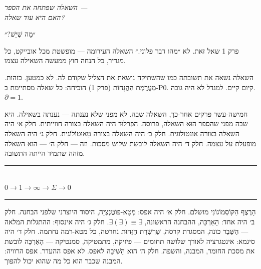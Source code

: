 \documentclass[10pt, openany, oneside]{book}
\renewcommand{\normalsize}{\fontsize{10}{13}\selectfont}
\begin{document}
\vspace{1.5em}

\begin{center}
    \textit{%
    השאלה שפתחה את הספר —\\
    האם היא עוד שאלה?}
\end{center}

\vspace{2em}


\noindent ״מַה שֶׁיֵּשׁ?״

פרק 1 שאל זאת. לא ״מהו דבר פלוני.״ השאלה העירומה — מופשטת מכל אובייקט, כל מגדיר, כל הנחה חוץ ממעשה השאילה עצמו.

השאלה נשאה את תשובתה כמו שהשתיקה נושאת את הצליל שקודם לה. לא כמטען. כזהות. מַעֲרֶמֶת הַהֲנָחוֹת (פרק 1) הוכיחה: כל שאלה מסתיימת ב-P0. קיום קיים. למגדל לא היה גובה. $\partial = 1$.

חמישה-עשר פרקים אחר-כך, השאלה שבה. לא מפני שלא נענתה — נענתה בשאילה. היא שבה מפני שהספר הוּא השאלה, פרוסה. הפְּרֵלוּד היה השאלה בצורה חווייתית. חלק א׳ היה השאלה בצורה אונטולוגית. חלק ב׳ היה השאלה בצורה טָאוּטוֹלוֹגִית. חלק ג׳ היה השאלה מופעלת על עצמה. חלק ד׳ היה השאלה לובשת שלוש מסכות. וזה — חלק ה׳ — הוא השאלה מזהה שתמיד הייתה התשובה.

\vspace{1.5em}


\begin{center}
    \rule{0.3\textwidth}{0.4pt}\\[0.5em]
    {\normalsize\bfseries\textsc{$0 \to 1 \to \infty \to \Sigma \to 0$}}\\[0.3em]
    \rule{0.3\textwidth}{0.4pt}
\end{center}

\vspace{1em}

\noindent הָרֶצֶף הַקּוֹסְמוֹגוֹנִי מושלם. חלק א׳ היה אפס: מֶטָא-פּוֹטֶנְצְיָה, היסוד היוצרני שלפני הבחנה. חלק ב׳ היה אחד: הָאַרְכֵּה, ההבחנה הראשונה, $\exists(\exists) \equiv \exists$. חלק ג׳ היה אינסוף: ההתגלות המלאה — הַשֶּׁבֶר כונה, המסגרת קרסה, שַׁרְשֶׁרֶת הַזֵּהוּת נחרטה, כל מטא-רמה נחתמה. חלק ד׳ היה סיגמא: אינטגרציה לאורך שלושה תחומים — פיזיקה, מתמטיקה, סמנטיקה — הָאַרְכֵּה לובשת את מסכת החומר, המבנה, והשפה. חלק ה׳ הוא הַשִּׁיבָה לאפס. לא אפס ההעדר. אפס הרוויה: המבנה שכבר הוא כל מה שהוא יכול להפוך.
\end{document}
